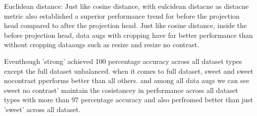   \begin{table}[H]
    \centering
    \caption{Evaluation Results on Different Datasets and Augmentations with euclidean distance}
    \label{tab:evaluation_results_euclidean}
\end{table}

    
Euclidean distance:
Just like  cosine distance, with eulcidean distacne as distacne metric also established a superior performance trend for before the projection head compared to after the
 projection head.
 Just like  cosine distance, inside the before projection head, data augs with cropping have far better performance than without cropping dataaugs such as resize and 
 resize no contrast.

 Eventhough 'strong' achieved 100 percentage accuracy across all dataset types except the full dataset unbalanced. when it comes to full dataset, sweet and sweet nocontrast pperforms better than all others.
 and among all data augs we can see sweet no contrast' maintain the cosistancey in performance across all dataset types with more than 97 percentage accuracy and also perfromed better than just 'sweet' across all dataset.
 
